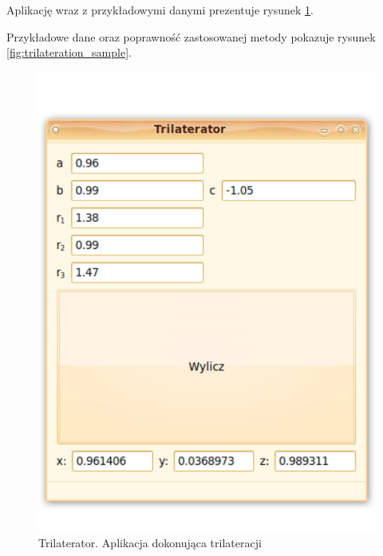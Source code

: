 Aplikację wraz z przykładowymi danymi prezentuje rysunek \ref{fig:trilaterator}.

Przykładowe dane oraz poprawność zastosowanej metody pokazuje rysunek \ref{fig:trilateration_sample}.

\begin{figure}
 \includegraphics[width=\textwidth]{gfx/trilaterator.pdf}
 \caption{Trilaterator. Aplikacja dokonująca trilateracji}
 \label{fig:trilaterator}
\end{figure}


